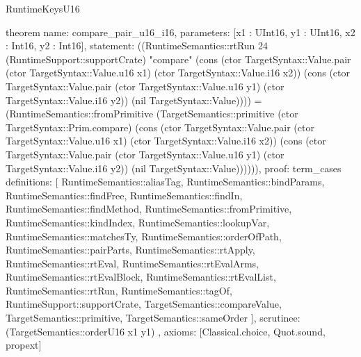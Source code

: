 \begin{lexlean}{RuntimeKeysU16}
\begin{semanticmodule}
theorem{
  name: compare_pair_u16_i16,
  parameters: [x1 : UInt16, y1 : UInt16, x2 : Int16, y2 : Int16],
  statement: ((RuntimeSemantics::rtRun 24 (RuntimeSupport::supportCrate) "compare" (cons (ctor TargetSyntax::Value.pair (ctor TargetSyntax::Value.u16 x1) (ctor TargetSyntax::Value.i16 x2)) (cons (ctor TargetSyntax::Value.pair (ctor TargetSyntax::Value.u16 y1) (ctor TargetSyntax::Value.i16 y2)) (nil TargetSyntax::Value)))) = (RuntimeSemantics::fromPrimitive (TargetSemantics::primitive (ctor TargetSyntax::Prim.compare) (cons (ctor TargetSyntax::Value.pair (ctor TargetSyntax::Value.u16 x1) (ctor TargetSyntax::Value.i16 x2)) (cons (ctor TargetSyntax::Value.pair (ctor TargetSyntax::Value.u16 y1) (ctor TargetSyntax::Value.i16 y2)) (nil TargetSyntax::Value)))))),
  proof: term_cases{
    definitions: [
      RuntimeSemantics::aliasTag,
      RuntimeSemantics::bindParams,
      RuntimeSemantics::findFree,
      RuntimeSemantics::findIn,
      RuntimeSemantics::findMethod,
      RuntimeSemantics::fromPrimitive,
      RuntimeSemantics::kindIndex,
      RuntimeSemantics::lookupVar,
      RuntimeSemantics::matchesTy,
      RuntimeSemantics::orderOfPath,
      RuntimeSemantics::pairParts,
      RuntimeSemantics::rtApply,
      RuntimeSemantics::rtEval,
      RuntimeSemantics::rtEvalArms,
      RuntimeSemantics::rtEvalBlock,
      RuntimeSemantics::rtEvalList,
      RuntimeSemantics::rtRun,
      RuntimeSemantics::tagOf,
      RuntimeSupport::supportCrate,
      TargetSemantics::compareValue,
      TargetSemantics::primitive,
      TargetSemantics::sameOrder
    ],
    scrutinee: (TargetSemantics::orderU16 x1 y1)
  },
  axioms: [Classical.choice, Quot.sound, propext]
}


\end{semanticmodule}
\end{lexlean}
